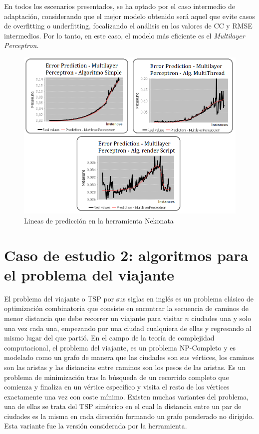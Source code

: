 En todos los escenarios presentados, se ha optado por el caso intermedio
de adaptación, considerando que el mejor modelo obtenido será aquel
que evite casos de overfitting o underfitting, focalizando el análisis
en los valores de \ac{CC} y \ac{RMSE} intermedios. Por lo tanto,
en este caso, el modelo más eficiente es el\emph{ Multilayer Perceptron.}



\begin{figure}[H]
\begin{centering}
\includegraphics[scale=0.47]{images/response_neural_MM}
\par\end{centering}

\caption{Lineas de predicción en la herramienta Nekonata \label{fig:Lineas-de-predicci=0000F3n-matrix}}
\end{figure}



\section{Caso de estudio 2: algoritmos para el problema del viajante\label{subsec:Escenario-1:-Algoritmos}}

El problema del viajante o \ac{TSP} por sus siglas en inglés es un
problema clásico de optimización combinatoria que consiste en encontrar
la secuencia de caminos de menor distancia que debe recorrer un viajante
para visitar $n$ ciudades una y solo una vez cada una, empezando
por una ciudad cualquiera de ellas y regresando al mismo lugar del
que partió. En el campo de la teoría de complejidad computacional,
el problema del viajante, es un problema NP-Completo y es modelado
como un grafo de manera que las ciudades son sus vértices, los caminos
son las aristas y las distancias entre caminos son los pesos de las
aristas. Es un problema de minimización tras la búsqueda de un recorrido
completo que comienza y finaliza en un vértice específico y visita
el resto de los vértices exactamente una vez con coste mínimo. Existen
muchas variantes del problema, una de ellas se trata del \ac{TSP}
simétrico en el cual la distancia entre un par de ciudades es la misma
en cada dirección formando un grafo ponderado no dirigido. Esta variante
fue la versión considerada por la herramienta. 

